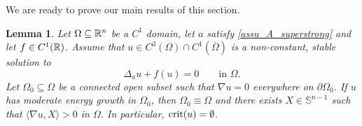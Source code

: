 \documentclass[10 pt,a4paper]{article}
\newtheorem{proposition}[definition]{Proposition}
\newtheorem{lemma}[definition]{Lemma}
\theoremstyle{definition}
\begin{document}
%

We are ready to prove our main results of this section.

\begin{lemma} \label{lem_Du0}
	Let $\Omega\subseteq\mathbb R^n$ be a $C^1$ domain, let $a$ satisfy \eqref{assu_A_superstrong} and let $f \in C^1(\mathbb R)$. Assume that $u \in C^3(\Omega)\cap C^1(\overline{\Omega})$ is a non-constant, stable solution to
	\[
		\Delta_a u + f(u) = 0 \qquad \text{in } \Omega.
	\]
%	
	Let $\Omega_0\subseteq\Omega$ be a connected open subset such that $\nabla u = 0$ everywhere on $\partial\Omega_0$. If $u$ has moderate energy growth in $\Omega_0$, then $\Omega_0 \equiv \Omega$ and there exists $X\in\mathbb{S}^{n-1}$ such that $\langle\nabla u,X\rangle > 0$ in $\Omega$. In particular, ${\rm crit}(u) = \emptyset$.
\end{lemma}
\end{document}
